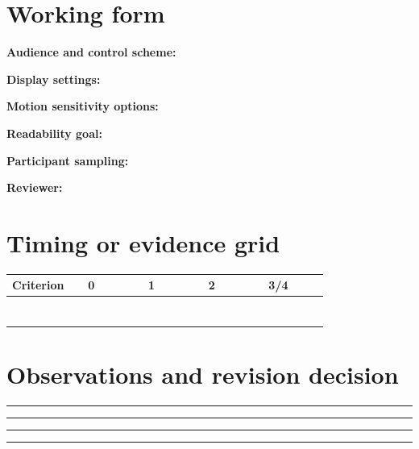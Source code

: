 \documentclass[10pt,letterpaper]{article}
\begin{document}
\section{Working form}
\noindent\textbf{Audience and control scheme:}\quad\hrulefill\par\vspace{10pt}
\noindent\textbf{Display settings:}\quad\hrulefill\par\vspace{10pt}
\noindent\textbf{Motion sensitivity options:}\quad\hrulefill\par\vspace{10pt}
\noindent\textbf{Readability goal:}\quad\hrulefill\par\vspace{10pt}
\noindent\textbf{Participant sampling:}\quad\hrulefill\par\vspace{10pt}
\noindent\textbf{Reviewer:}\quad\hrulefill\par\vspace{10pt}\section{Timing or evidence grid}
\begin{longtable}{|p{0.156\linewidth}|p{0.156\linewidth}|p{0.156\linewidth}|p{0.156\linewidth}|p{0.156\linewidth}|}
\hline
\textbf{Criterion} & \textbf{0} & \textbf{1} & \textbf{2} & \textbf{3/4}\\\hline
\endhead
\rule{0pt}{20pt} &  &  &  & \\\hline
\rule{0pt}{20pt} &  &  &  & \\\hline
\rule{0pt}{20pt} &  &  &  & \\\hline
\rule{0pt}{20pt} &  &  &  & \\\hline
\rule{0pt}{20pt} &  &  &  & \\\hline
\rule{0pt}{20pt} &  &  &  & \\\hline
\rule{0pt}{20pt} &  &  &  & \\\hline
\end{longtable}
\section{Observations and revision decision}
\noindent\rule{\linewidth}{0.4pt}\par\vspace{18pt}\noindent\rule{\linewidth}{0.4pt}\par\vspace{18pt}\noindent\rule{\linewidth}{0.4pt}\par\vspace{18pt}\noindent\rule{\linewidth}{0.4pt}\par\vspace{18pt}
\end{document}
